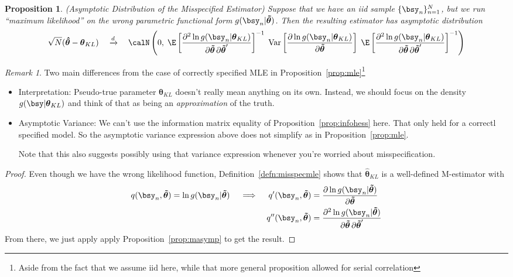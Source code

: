 \documentclass[12pt]{article}
\theoremstyle{plain}
\newtheorem{prop}[thm]{Proposition}
\theoremstyle{definition}
\theoremstyle{remark}
\newtheorem*{rmk}{Remark}
\newcommand{\bstheta}{\boldsymbol{\theta}}
\newcommand{\bshattheta}{\boldsymbol{\hat{\theta}}}
\newcommand{\bstildetheta}{\boldsymbol{\tilde{\theta}}}
\newcommand{\Var}{\operatorname{Var}}
\newcommand{\dto}{\xrightarrow{d}}
\newcommand{\nN}{_{n=1}^N}
\begin{document}
\begin{prop}(Asymptotic Distribution of the Misspecified Estimator)
Suppose that we have an iid sample $\{\bsy_n\}\nN$, but we run ``maximum
likelihood'' on the \emph{wrong} parametric functional form
$g(\bsy_n|\bstildetheta)$. Then the resulting estimator has asymptotic
distribution
\begin{align*}
  \sqrt{N}(\bshattheta-\bstheta_{KL})
  \quad\dto\quad
  \calN\left(0,\;
  \E\left[
  \frac{\partial^2 \ln g(\bsy_n|\bstheta_{KL})}{%
    \partial\bstildetheta\,\partial\bstildetheta'}
  \right]^{-1}
  \;
  \Var\left[
    \frac{\partial \ln g(\bsy_n|\bstheta_{KL})}{\partial \bstildetheta}
  \right]
  \;
  \E\left[
  \frac{\partial^2 \ln g(\bsy_n|\bstheta_{KL})}{%
    \partial\bstildetheta\,\partial\bstildetheta'}
  \right]^{-1}
  \right)
\end{align*}
\end{prop}
\begin{rmk}
Two main differences from the case of correctly specified MLE in
Proposition~\ref{prop:mle}\footnote{%
  Aside from the fact that we assume iid here, while that more general
  proposition allowed for serial correlation
}
\begin{itemize}
  \item Interpretation:
    Pseudo-true parameter $\bstheta_{KL}$ doesn't really mean anything
    on its own.
    Instead, we should focus on the density $g(\bsy|\bstheta_{KL})$ and
    think of that as being an \emph{approximation} of the truth.
  \item Asymptotic Variance:
    We can't use the information matrix equality of
    Proposition~\ref{prop:infohess} here. That only held for a correctl
    specified model. So the asymptotic variance expression above does
    not simplify as in Proposition~\ref{prop:mle}.

    Note that this also suggests possibly using that variance expression
    whenever you're worried about misspecification.
\end{itemize}
\end{rmk}
\begin{proof}
Even though we have the wrong likelihood function,
Definition~\ref{defn:misspecmle} shows that $\bshattheta_{KL}$ is a
well-defined M-estimator with
\begin{align*}
  q(\bsy_n,\bstildetheta)
  =
  \ln g(\bsy_n|\bstildetheta)
  \quad\implies\quad
  q'(\bsy_n,\bstildetheta)
  &=
  \frac{\partial \ln g(\bsy_n|\bstildetheta)}{\partial \bstildetheta}
  \\
  q''(\bsy_n,\bstildetheta)
  &=
  \frac{\partial^2 \ln g(\bsy_n|\bstildetheta)}{%
    \partial\bstildetheta\,\partial\bstildetheta'}
\end{align*}
From there, we just apply apply Proposition~\ref{prop:masymp} to get the
result.
\end{proof}
\end{document}
